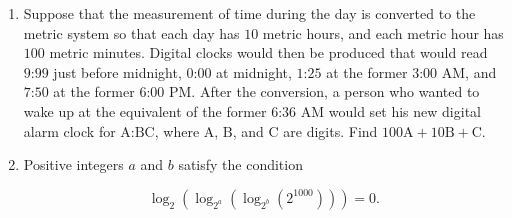 \documentclass{article}
\begin{document}
\begin{enumerate}[label=\arabic*., itemsep=0.5em]
\item Suppose that the measurement of time during the day is converted to the metric system so that each day has \(10\) metric hours, and each metric hour has \(100\) metric minutes. Digital clocks would then be produced that would read \(\text{9:99}\) just before midnight, \(\text{0:00}\) at midnight, \(\text{1:25}\) at the former \(\text{3:00}\) AM, and \(\text{7:50}\) at the former \(\text{6:00}\) PM. After the conversion, a person who wanted to wake up at the equivalent of the former \(\text{6:36}\) AM would set his new digital alarm clock for \(\text{A:BC}\), where \(\text{A}\), \(\text{B}\), and \(\text{C}\) are digits. Find \(100\text{A}+10\text{B}+\text{C}\).\par \vspace{0.5em}\item Positive integers \(a\) and \(b\) satisfy the condition

\begin{equation*}
\log_2(\log_{2^a}(\log_{2^b}(2^{1000}))) = 0.
\end{equation*}


\end{enumerate}
\end{document}
